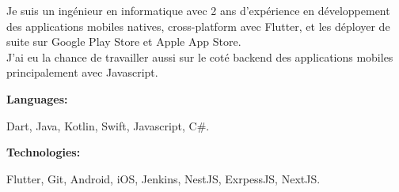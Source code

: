 \documentclass[9pt]{developercv} %
\begin{document}
\begin{minipage}[t]{0.46\textwidth}
    \vspace{-6pt}

    Je suis un ingénieur en informatique avec 2 ans d'expérience en développement des applications mobiles natives, cross-platform avec Flutter, et les déployer de suite sur Google Play Store et Apple App Store.\\J'ai eu la chance de travailler aussi sur le coté backend des applications mobiles principalement avec Javascript.
\end{minipage}
\hfill %
\begin{minipage}[t]{0.465\textwidth}
    \vspace{-6pt}

    \begin{minipage}[t]{0.2\textwidth}
        \textbf{Languages:}
    \end{minipage}
    \hfill
    \begin{minipage}[t]{0.73\textwidth}
        Dart, Java, Kotlin, Swift, Javascript, C\#.
    \end{minipage}
    \vspace{4mm}

    \begin{minipage}[t]{0.2\textwidth}
        \textbf{Technologies:}
    \end{minipage}
    \hfill
    \begin{minipage}[t]{0.73\textwidth}
        Flutter, Git, Android, iOS, Jenkins, NestJS, ExrpessJS, NextJS.
    \end{minipage}

\end{minipage}
\end{document}

